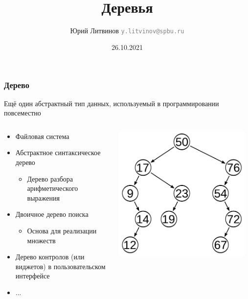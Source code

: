 \documentclass[xetex,mathserif,serif]{beamer}
\title{Деревья}
\author[Юрий Литвинов]{Юрий Литвинов \newline \textcolor{gray}{\small\texttt{y.litvinov@spbu.ru}}}
\date{26.10.2021}
\begin{document}
    
    \frame{\titlepage}
    
    \begin{frame}
        \frametitle{Дерево}
        Ещё один абстрактный тип данных, используемый в программировании повсеместно
        \begin{columns}
            \begin{column}{0.55\textwidth}
                \begin{itemize}
                    \item Файловая система
                    \item Абстрактное синтаксическое дерево
                    \begin{itemize}
                        \item Дерево разбора арифметического выражения
                    \end{itemize}
                    \item Двоичное дерево поиска
                    \begin{itemize}
                        \item Основа для реализации множеств
                    \end{itemize}
                    \item Дерево контролов (или виджетов) в пользовательском интерфейсе
                    \item ...
                \end{itemize}
            \end{column}
            \begin{column}{0.45\textwidth}
                \begin{center}
                    \includegraphics[width=0.95\textwidth]{tree.png}
                \end{center}
            \end{column}
        \end{columns}
    \end{frame}
\end{document}

